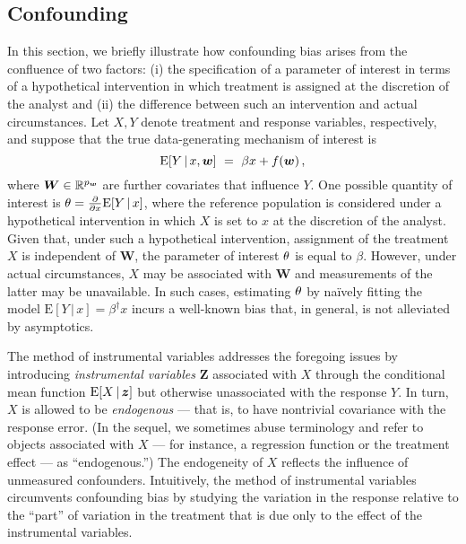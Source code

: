 \documentclass{uwstat572}
\newcommand{\be}{\begin{equation}}
\newcommand{\ee}{\end{equation}}
\theoremstyle{definition}
\theoremstyle{remark}
\newcommand{\R}{\ensuremath{\mathbb{R}}}
\newcommand{\gb}{\beta}
\newcommand{\gep}{\epsilon}
\newcommand{\pdd}[2]{\frac{\partial #1}{\partial #2}}
\newcommand{\E}{\mathrm{E}}
\newcommand{\bs}[1]{\boldsymbol{#1}}
\numberwithin{equation}{section}
\begin{document}
%

\subsection{Confounding}\label{ss:conf}
\newcommand{\rg}{\bs{\gamma}}
\newcommand{\W}{\bs{W}}
\newcommand{\Z}{\bs{Z}}
\newcommand{\erry}{\gep}
\newcommand{\pd}{\partial}

In this section, we briefly illustrate how confounding bias arises from the confluence of two factors: (i) the specification of a parameter of interest in terms of a hypothetical intervention in which treatment is assigned at the discretion of the analyst and (ii) the difference between such an intervention and actual circumstances. Let $X, Y$ denote treatment and response variables, respectively, and suppose that the true data-generating mechanism of interest is
\be\label{eq:conf1}
	\E[Y\,|\,x, \w] \ = \ \gb x + f(\w) \,, %
\ee
where $\W\in\R^\pw$ are further covariates that influence $Y$. One possible quantity of interest is $\eft = \pdd{}{x}\E[Y\,|\,x]$, where the reference population is considered under a hypothetical intervention in which $X$ is set to $x$ at the discretion of the analyst. Given that, under such a hypothetical intervention, assignment of the treatment $X$ is independent of $\W$, the parameter of interest $\theta$ is equal to $\gb$. However, under actual circumstances, $X$ may be associated with $\W$ and measurements of the latter may be unavailable. In such cases, estimating $\theta$ by na\"ively fitting the model $\E[Y\,|\,x] = \gb^\dagger x$ incurs a well-known bias that, in general, is not alleviated by asymptotics.
 
The method of instrumental variables addresses the foregoing issues by introducing \emph{instrumental variables} $\Z$ associated with $X$ through the conditional mean function $\E[X\,|\,\z]$ but otherwise unassociated with the response $Y$. In turn, $X$ is allowed to be \emph{endogenous} --- that is, to have nontrivial covariance with the response error. (In the sequel, we sometimes abuse terminology and refer to objects associated with $X$ --- for instance, a regression function or the treatment effect --- as ``endogenous.'') The endogeneity of $X$ reflects the influence of unmeasured confounders. Intuitively, the method of instrumental variables circumvents confounding bias by studying the variation in the response relative to the ``part'' of variation in the treatment that is due only to the effect of the instrumental variables. 
\end{document}
